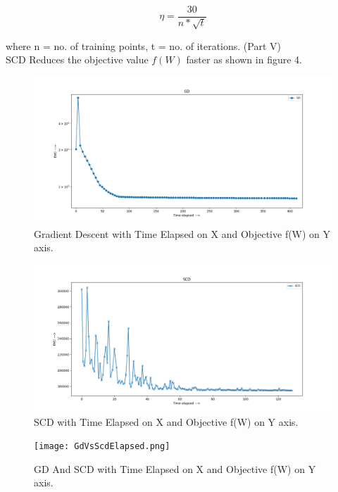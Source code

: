 \documentclass[a4paper,11pt]{article}
\begin{document}
\begin{mlsolution}
\[
\eta = \frac{30}{n*\sqrt{t}}
\]

where n = no. of training points, t = no. of iterations.
\newpage
(Part V)\\

SCD Reduces the objective value $f(W)$ faster as shown in figure 4.

\begin{figure}[th]%
\centering
\includegraphics[width=1.2\columnwidth]{GD-elapsed.png}%

\caption{Gradient Descent with Time Elapsed on X and Objective f(W) on Y axis.}%
\label{fig:GD1}%
\end{figure}

\begin{figure}[th]%
\centering
\includegraphics[width=1.2\columnwidth]{SCD-elapsed.png}%

\caption{SCD with Time Elapsed on X and Objective f(W) on Y axis.}%
\label{fig:SCD1}%
\end{figure}

\begin{figure}[th]%
\centering
\texttt{[image: GdVsScdElapsed.png]}%

\caption{GD And SCD with Time Elapsed on X and Objective f(W) on Y axis.}%
\label{fig:GD3}%
\end{figure}



\end{mlsolution}
\end{document}
